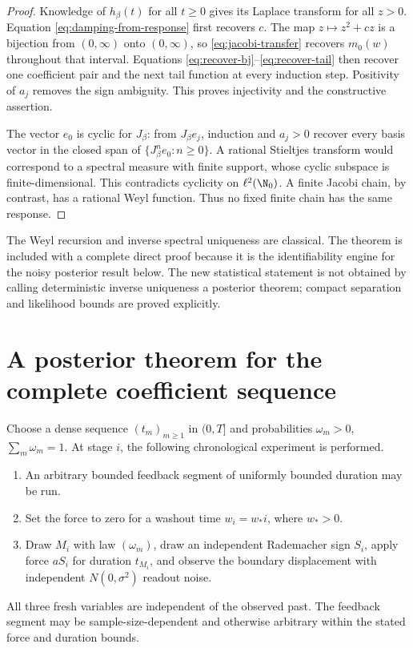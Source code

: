 \begin{proof}
Knowledge of \(h_\beta(t)\) for all \(t\ge0\) gives its Laplace transform for
all \(z>0\).  Equation \eqref{eq:damping-from-response} first recovers \(c\).
The map \(z\mapsto z^2+cz\) is a bijection from \((0,\infty)\) onto
\((0,\infty)\), so \eqref{eq:jacobi-transfer} recovers \(m_0(w)\) throughout
that interval.  Equations \eqref{eq:recover-bj}--\eqref{eq:recover-tail} then
recover one coefficient pair and the next tail function at every induction
step.  Positivity of \(a_j\) removes the sign ambiguity.  This proves
injectivity and the constructive assertion.

The vector \(e_0\) is cyclic for \(J_\beta\): from
\(J_\beta e_j\), induction and \(a_j>0\) recover every basis vector in the
closed span of \(\{J_\beta^ne_0:n\ge0\}\).  A rational Stieltjes transform
would correspond to a spectral measure with finite support, whose cyclic
subspace is finite-dimensional.  This contradicts cyclicity on
\(\ell^2(\N_0)\).  A finite Jacobi chain, by contrast, has a rational Weyl
function.  Thus no fixed finite chain has the same response.
\end{proof}

\begin{remark}
The Weyl recursion and inverse spectral uniqueness are classical.  The theorem
is included with a complete direct proof because it is the identifiability
engine for the noisy posterior result below.  The new statistical statement
is not obtained by calling deterministic inverse uniqueness a posterior
theorem; compact separation and likelihood bounds are proved explicitly.
\end{remark}

\section{A posterior theorem for the complete coefficient sequence}
\label{sec:jacobi-statistics}

Choose a dense sequence \((t_m)_{m\ge1}\) in \((0,T]\) and probabilities
\(\omega_m>0\), \(\sum_m\omega_m=1\).  At stage \(i\), the following
chronological experiment is performed.
\begin{enumerate}
\item An arbitrary bounded feedback segment of uniformly bounded duration may
be run.
\item Set the force to zero for a washout time \(w_i=w_*i\), where \(w_*>0\).
\item Draw \(M_i\) with law \((\omega_m)\), draw an independent Rademacher
sign \(S_i\), apply force \(aS_i\) for duration \(t_{M_i}\), and observe the
boundary displacement with independent \(N(0,\sigma^2)\) readout noise.
\end{enumerate}
All three fresh variables are independent of the observed past.  The
feedback segment may be sample-size-dependent and otherwise arbitrary within
the stated force and duration bounds.

